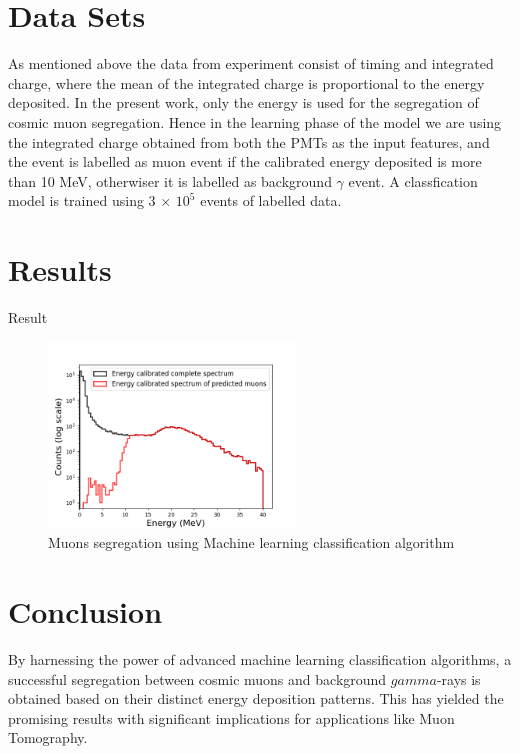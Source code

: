 \documentclass[twocolumn,amsmath,amssymb]{snp}
\begin{document}
\section*{Data Sets}
As mentioned above the data from experiment consist of timing and integrated charge, where the mean of the integrated charge is proportional to the energy deposited. In the present work, only the energy is used for the segregation of cosmic muon segregation. Hence in the learning phase of the model we are using the integrated charge obtained from both the PMTs as the input features, and the event is labelled as muon event if the calibrated energy deposited is more than 10 MeV, otherwiser it is labelled as background $\gamma$ event. A classfication model is trained using 3 $\times$ $10^{5}$ events of labelled data.

\section*{Results}
Result
\begin{figure}
\includegraphics[width=66mm]{prediction.png}%
\caption{\label{classfication} Muons segregation using Machine learning classification algorithm}
\end{figure}
\section*{Conclusion}
By harnessing the power of advanced machine learning classification algorithms, a successful segregation between cosmic muons and background $gamma$-rays is obtained based on their distinct energy deposition patterns. This has yielded the promising results with significant implications for applications like Muon Tomography. \\

\end{document}
